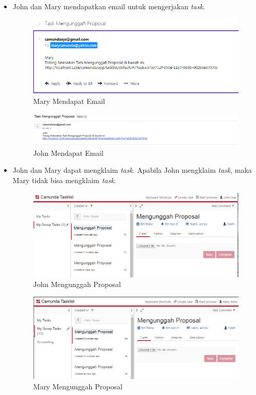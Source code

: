 {\begin{itemize}
	\item John dan Mary mendapatkan email untuk mengerjakan \textit{task}.
		\begin{figure}[H]
			\centering
			\includegraphics[scale=0.5]{Gambar/Bab-5/uji2-2}
			\caption{Mary Mendapat Email} 
			\label{fig:marydapatemail}
		\end{figure}
		
		\begin{figure}[H]
			\centering
			\includegraphics[scale=0.5]{Gambar/Bab-5/uji2-3}
			\caption{John Mendapat Email} 
			\label{fig:johndapatemail}
		\end{figure}

	\item John dan Mary dapat mengklaim \textit{task}. Apabila John mengklaim \textit{task}, maka Mary tidak bisa mengklaim \textit{task}.
			\begin{figure}[H]
			\centering
			\includegraphics[scale=0.5]{Gambar/Bab-5/uji2-4}
			\caption{John Mengunggah Proposal} 
			\label{fig:johnUnggahProposal}
		\end{figure}
		
\begin{figure}[H]
			\centering
			\includegraphics[scale=0.5]{Gambar/Bab-5/uji2-5}
			\caption{Mary Mengunggah Proposal} 
			\label{fig:maryUnggahProposal}
		\end{figure}
		

\end{itemize}}
